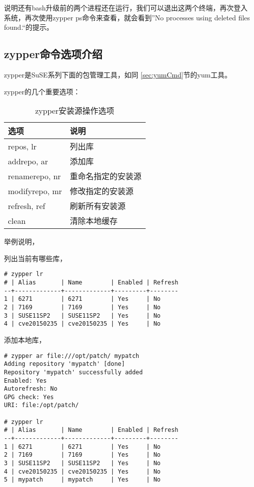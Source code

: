 说明还有bash升级前的两个进程还在运行，我们可以退出这两个终端，再次登入
系统，再次使用zypper ps命令来查看，就会看到”No processes using deleted
files found.“的提示。

\subsection{zypper命令选项介绍}
\label{subsec:zypperCmdopt}

zypper是SuSE系列下面的包管理工具，如同
\ref{sec:yumCmd}节的yum工具。

zypper的几个重要选项：

\begin{table}[!htbp]
  \centering
    \caption{zypper安装源操作选项}
    \begin{tabular}{ll}
      \toprule
      选项           & 说明 \\
      \midrule
      repos, lr      & 列出库 \\
      addrepo, ar    & 添加库 \\
      renamerepo, nr & 重命名指定的安装源 \\
      modifyrepo, mr & 修改指定的安装源 \\
      refresh, ref   & 刷新所有安装源 \\
      clean          & 清除本地缓存 \\
      \bottomrule
    \end{tabular}
\end{table}

举例说明，

列出当前有哪些库，

\begin{verbatim}
# zypper lr
# | Alias       | Name        | Enabled | Refresh
--+-------------+-------------+---------+--------
1 | 6271        | 6271        | Yes     | No     
2 | 7169        | 7169        | Yes     | No     
3 | SUSE11SP2   | SUSE11SP2   | Yes     | No     
4 | cve20150235 | cve20150235 | Yes     | No
\end{verbatim}

添加本地库，

\begin{verbatim}
# zypper ar file:///opt/patch/ mypatch
Adding repository 'mypatch' [done]
Repository 'mypatch' successfully added
Enabled: Yes
Autorefresh: No
GPG check: Yes
URI: file:/opt/patch/

# zypper lr
# | Alias       | Name        | Enabled | Refresh
--+-------------+-------------+---------+--------
1 | 6271        | 6271        | Yes     | No     
2 | 7169        | 7169        | Yes     | No     
3 | SUSE11SP2   | SUSE11SP2   | Yes     | No     
4 | cve20150235 | cve20150235 | Yes     | No
5 | mypatch     | mypatch     | Yes     | No
\end{verbatim}

